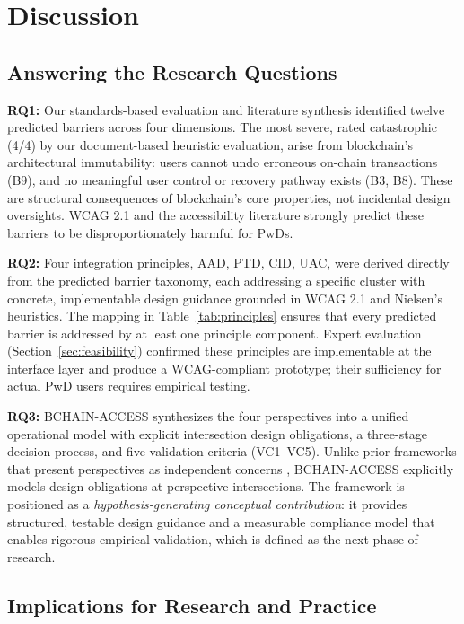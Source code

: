 \documentclass[journal,onecolumn]{IEEEtran}
\begin{document}
\section{Discussion}
\label{sec:discussion}

\subsection{Answering the Research Questions}

\textbf{RQ1:} Our standards-based evaluation and literature synthesis identified twelve predicted barriers across four dimensions. The most severe, rated catastrophic (4/4) by our document-based heuristic evaluation, arise from blockchain's architectural immutability: users cannot undo erroneous on-chain transactions (B9), and no meaningful user control or recovery pathway exists (B3, B8). These are structural consequences of blockchain's core properties, not incidental design oversights. WCAG 2.1 and the accessibility literature strongly predict these barriers to be disproportionately harmful for PwDs.

\textbf{RQ2:} Four integration principles, AAD, PTD, CID, UAC, were derived directly from the predicted barrier taxonomy, each addressing a specific cluster with concrete, implementable design guidance grounded in WCAG 2.1 and Nielsen's heuristics. The mapping in Table~\ref{tab:principles} ensures that every predicted barrier is addressed by at least one principle component. Expert evaluation (Section~\ref{sec:feasibility}) confirmed these principles are implementable at the interface layer and produce a WCAG-compliant prototype; their sufficiency for actual PwD users requires empirical testing.

\textbf{RQ3:} BCHAIN-ACCESS synthesizes the four perspectives into a unified operational model with explicit intersection design obligations, a three-stage decision process, and five validation criteria (VC1--VC5). Unlike prior frameworks that present perspectives as independent concerns \cite{khalid2023blockchain,tharani2022ui}, BCHAIN-ACCESS explicitly models design obligations at perspective intersections. The framework is positioned as a \textit{hypothesis-generating conceptual contribution}: it provides structured, testable design guidance and a measurable compliance model that enables rigorous empirical validation, which is defined as the next phase of research.

\subsection{Implications for Research and Practice}
\end{document}
